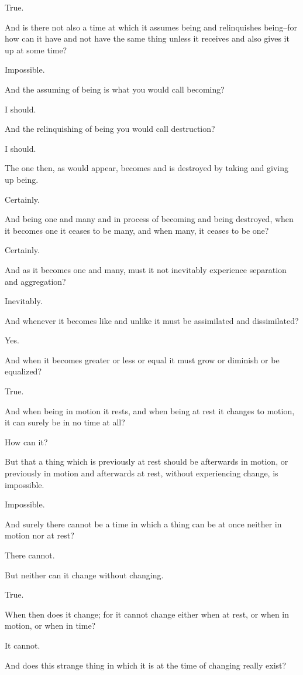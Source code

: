 True.

And is there not also a time at which it assumes being and relinquishes
being--for how can it have and not have the same thing unless it
receives and also gives it up at some time?

Impossible.

And the assuming of being is what you would call becoming?

I should.

And the relinquishing of being you would call destruction?

I should.

The one then, as would appear, becomes and is destroyed by taking and
giving up being.

Certainly.

And being one and many and in process of becoming and being destroyed,
when it becomes one it ceases to be many, and when many, it ceases to be
one?

Certainly.

And as it becomes one and many, must it not inevitably experience
separation and aggregation?

Inevitably.

And whenever it becomes like and unlike it must be assimilated and
dissimilated?

Yes.

And when it becomes greater or less or equal it must grow or diminish or
be equalized?

True.

And when being in motion it rests, and when being at rest it changes to
motion, it can surely be in no time at all?

How can it?

But that a thing which is previously at rest should be afterwards
in motion, or previously in motion and afterwards at rest, without
experiencing change, is impossible.

Impossible.

And surely there cannot be a time in which a thing can be at once
neither in motion nor at rest?

There cannot.

But neither can it change without changing.

True.

When then does it change; for it cannot change either when at rest, or
when in motion, or when in time?

It cannot.

And does this strange thing in which it is at the time of changing
really exist?

